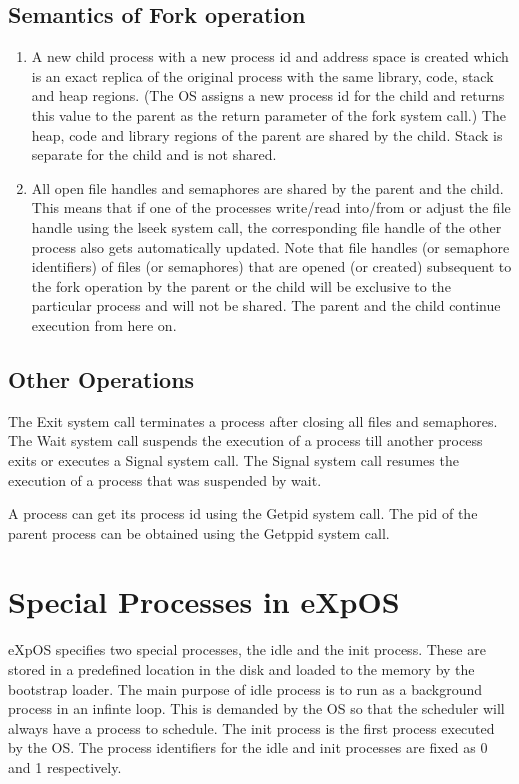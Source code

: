 \subsection{Semantics of Fork operation}
\begin{enumerate}
\item A new child process with a new process id and address space is created which is an exact replica of the original process with the same library, code, stack and heap regions. (The OS assigns a new process id for the child and returns this value to the parent as the return parameter of the fork system call.) The heap, code and library regions of the parent are shared by the child. Stack is separate for the child and is not shared.
\item All open file handles and semaphores are shared by the parent and the child. This means that if one of the processes write/read into/from or adjust the file handle using the lseek system call, the corresponding file handle of the other process also gets automatically updated. Note that file handles (or semaphore identifiers) of files (or semaphores) that are opened (or created) subsequent to the fork operation by the parent or the child will be exclusive to the particular process and will not be shared. The parent and the child continue execution from here on.
\end{enumerate}

\subsection{Other Operations}
The Exit system call terminates a process after closing all files and semaphores. The Wait system call suspends the execution of a process till another process exits or executes a Signal system call. The Signal system call resumes the execution of a process that was suspended by wait.

A process can get its process id using the Getpid system call. The pid of the parent process can be obtained using the Getppid system call.

\section{Special Processes in eXpOS}
eXpOS specifies two special processes, the idle and the init process. These are stored in a predefined location in the disk and loaded to the memory by the bootstrap loader. The main purpose of idle process is to run as a background process in an infinte loop. This is demanded by the OS so that the scheduler will always have a process to schedule. The init process is the first process executed by the OS. The process identifiers for the idle and init processes are fixed as 0 and 1 respectively.



